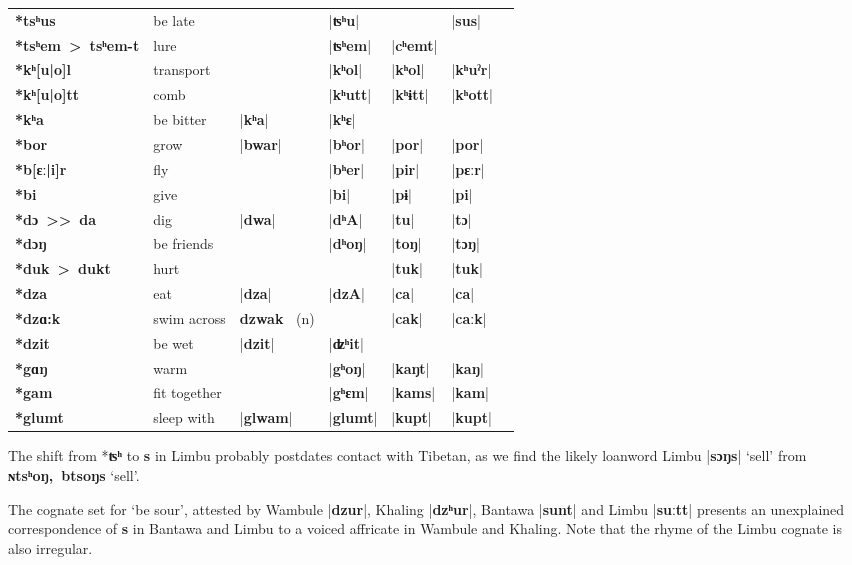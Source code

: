 \documentclass[oldfontcommands,oneside,a4paper,11pt]{article}
\newcommand{\ipa}[1]{\textbf{{\phon\mbox{#1}}}} %
\newcommand{\dhatu}[2]{|\ipa{#1}| `#2'}
\newcommand{\dhat}[1]{|\ipa{#1}|}
\begin{document}
\begin{table}
\begin{tabular}{lllllll}
\ipa{*tsʰus} &	be late &	&	\dhat{ʦʰu} &	&	\dhat{sus} &	\\
\ipa{*tsʰem > tsʰem-t} &	lure &	&	\dhat{ʦʰem} &	\dhat{cʰemt} &	&	\\
\midrule
\ipa{*kʰ[u|o]l} &	transport &	&	\dhat{kʰol} &	\dhat{kʰol} &	\dhat{kʰuˀr} &	\\
\ipa{*kʰ[u|o]tt} &	comb &	&	\dhat{kʰutt} &	\dhat{kʰɨtt} &	\dhat{kʰott} &	\\
\ipa{*kʰa} &	be bitter &	\dhat{kʰa} &	\dhat{kʰɛ} &	&	&	\\
\midrule
\ipa{*bor} &	grow &	\dhat{bwar} &	\dhat{bʰor} &	\dhat{por} &	\dhat{por} &	\\
\ipa{*b[ɛː|i]r} &	fly &	&	\dhat{bʰer} &	\dhat{pir} &	\dhat{pɛːr} &	\\
\ipa{*bi} &	give &	&	\dhat{bi} &	\dhat{pɨ} &	\dhat{pi} &	\\
\midrule
\ipa{*dɔ >{}>  da} &	dig &	\dhat{dwa} &	\dhat{dʰA} &	\dhat{tu} &	\dhat{tɔ} &	\\
\ipa{*dɔŋ} &	be friends &	&	\dhat{dʰoŋ} &	\dhat{toŋ} &	\dhat{tɔŋ} &	\\
\ipa{*duk > dukt} &	hurt &	&	&	\dhat{tuk} &	\dhat{tuk} &	\\
\midrule				
\ipa{*dza} &	eat &	\dhat{dza} &	\dhat{dzA} &	\dhat{ca} &	\dhat{ca} &	\\
\ipa{*dzɑ:k} &	swim across &	\ipa{dzwak } (n) &	&	\dhat{cak} &	\dhat{caːk} &	\\
\ipa{*dzit} &	be wet &	\dhat{dzit}   &	\dhat{ʣʰit} &	&	&	\\
\midrule		
\ipa{*gɑŋ} &	warm &	&	\dhat{gʰoŋ} &	\dhat{kaŋt} &	\dhat{kaŋ} &	\\
\ipa{*gam} &	fit together &	&	\dhat{gʰɛm} &	\dhat{kams} &	\dhat{kam} &	\\
\ipa{*glumt} &	sleep with &	\dhat{glwam} &	\dhat{glumt} &	\dhat{kupt} &	\dhat{kupt} &	\\
\bottomrule
\end{tabular}
\end{table}

The shift from *\ipa{ʦʰ} to \ipa{s} in Limbu probably postdates contact with Tibetan, as we find the likely loanword Limbu \dhatu{sɔŋs}{sell} from \ipa{ɴtsʰoŋ, btsoŋs} `sell'.


The cognate set for `be sour', attested by Wambule |\ipa{dzur}|, Khaling |\ipa{dzʰur}|, Bantawa |\ipa{sunt}| and Limbu |\ipa{suːtt}| presents an unexplained correspondence of \ipa{s} in Bantawa and Limbu to a voiced affricate in Wambule and Khaling. Note that the rhyme of the Limbu cognate is also irregular.
\end{document}

